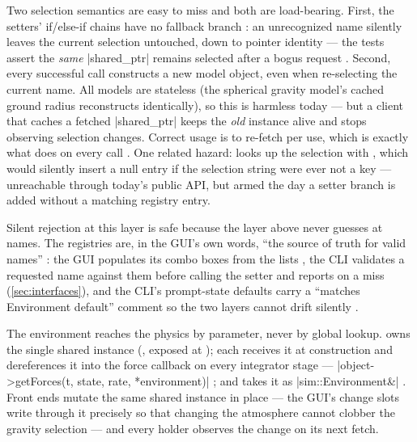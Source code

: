 \begin{keyinsight}
Two selection semantics are easy to miss and both are load-bearing. First, the setters'
if/else-if chains have no fallback branch 
: an unrecognized name silently leaves the current selection
untouched, down to pointer identity --- the tests assert the \emph{same}
\cppinline|shared_ptr| remains selected after a bogus request
. Second, every successful  call
constructs a new model object, even when re-selecting the current name. All models are
stateless (the spherical gravity model's cached ground radius reconstructs identically), so
this is harmless today --- but a client that caches a fetched \cppinline|shared_ptr| keeps
the \emph{old} instance alive and stops observing selection changes. Correct usage is to
re-fetch per use, which is exactly what  does on every call
 . One related hazard:
 looks up the selection with 
, which would silently insert a null entry if the selection
string were ever not a key --- unreachable through today's public API, but armed the day a
setter branch is added without a matching registry entry.
\end{keyinsight}

Silent rejection at this layer is safe because the layer above never guesses at names. The
registries are, in the GUI's own words, ``the source of truth for valid names''
: the GUI populates its combo boxes from the
 lists , the CLI validates a
requested name against them before calling the setter and reports  on a miss
  (\cref{sec:interfaces}), and the CLI's
prompt-state defaults carry a ``matches Environment default'' comment so the two layers
cannot drift silently .

\begin{designrule}
The environment reaches the physics by parameter, never by global lookup. 
owns the single shared instance (, exposed at );
each  receives it at construction  and
dereferences it into the force callback on every integrator stage ---
\cppinline|object->getForces(t, state, rate, *environment)| ;
and  takes it as \cppinline|sim::Environment&|
. Front ends mutate the same shared instance in place --- the
GUI's change slots write through it precisely so that changing the atmosphere cannot clobber
the gravity selection  --- and every holder observes the
change on its next fetch.
\end{designrule}

